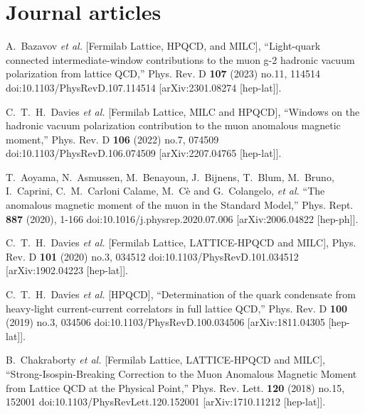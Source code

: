 \section{Journal articles}

\begin{thebibliography}{130}

A.~Bazavov \textit{et al.} [Fermilab Lattice, HPQCD, and MILC],
``Light-quark connected intermediate-window contributions to the muon g-2 hadronic vacuum polarization from lattice QCD,''
Phys. Rev. D \textbf{107} (2023) no.11, 114514
doi:10.1103/PhysRevD.107.114514
[arXiv:2301.08274 [hep-lat]].
  
C.~T.~H.~Davies \textit{et al.} [Fermilab Lattice, MILC and HPQCD],
``Windows on the hadronic vacuum polarization contribution to the
muon anomalous magnetic moment,''
Phys. Rev. D \textbf{106} (2022) no.7, 074509
doi:10.1103/PhysRevD.106.074509
[arXiv:2207.04765 [hep-lat]].

T.~Aoyama, N.~Asmussen, M.~Benayoun, J.~Bijnens, T.~Blum, M.~Bruno,
I.~Caprini, C.~M.~Carloni Calame, M.~C\`e and G.~Colangelo, \textit{et
  al.}
``The anomalous magnetic moment of the muon in the Standard Model,''
Phys. Rept. \textbf{887} (2020), 1-166
doi:10.1016/j.physrep.2020.07.006
[arXiv:2006.04822 [hep-ph]].

C.~T.~H.~Davies \textit{et al.} [Fermilab Lattice, LATTICE-HPQCD and
  MILC],
Phys. Rev. D \textbf{101} (2020) no.3, 034512
doi:10.1103/PhysRevD.101.034512
[arXiv:1902.04223 [hep-lat]].

C.~T.~H.~Davies \textit{et al.} [HPQCD],
``Determination of the quark condensate from heavy-light
current-current correlators in full lattice QCD,''
Phys. Rev. D \textbf{100} (2019) no.3, 034506
doi:10.1103/PhysRevD.100.034506
[arXiv:1811.04305 [hep-lat]].

B.~Chakraborty \textit{et al.} [Fermilab Lattice, LATTICE-HPQCD and
  MILC],
``Strong-Isospin-Breaking Correction to the Muon Anomalous Magnetic
Moment from Lattice QCD at the Physical Point,''
Phys. Rev. Lett. \textbf{120} (2018) no.15, 152001
doi:10.1103/PhysRevLett.120.152001
[arXiv:1710.11212 [hep-lat]].


\end{thebibliography}
